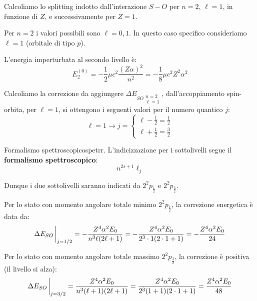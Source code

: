 \begin{exercise}
    Calcoliamo lo splitting indotto dall'interazione \( S-O \) per \( n=2 \), \( \ell=1 \), in funzione di \( Z \), e successivamente per \( Z=1 \).

\begin{solution}

Per \( n=2 \) i valori possibili sono \( \ell=0, 1 \). In questo caso specifico consideriamo \( \ell=1 \) (orbitale di tipo \( p \)).

L'energia imperturbata al secondo livello è:
\begin{equation}
    E_2^{(0)} = -\frac{1}{2} \mu c^2 \frac{(Z\alpha)^2}{n^2} = -\frac{1}{8} \mu c^2 Z^2 \alpha^2
\end{equation}

Calcoliamo la correzione da aggiungere \(\Delta E_{SO \substack{n=2 \\ \ell=1}}\), 
dall'accoppiamento spin-orbita, per \( \ell=1 \), si ottengono i seguenti valori per il numero quantico \( j \):
\begin{equation*}
    \ell=1 \longrightarrow j =
    \begin{cases}
        \ell - \frac{1}{2} = \frac{1}{2} \\[1ex]
        \ell + \frac{1}{2} = \frac{3}{2}
    \end{cases}
\end{equation*}
\begin{note}{Formalismo spettroscopico}{spetrr.}
    L'indicizzazione per i sottolivelli segue il \textbf{formalismo spettroscopico}:
\begin{equation}
    n ^{2s+1} \ell_j
\end{equation}
\end{note}

Dunque i due sottolivelli saranno indicati da \( 2^2 p_{\frac{1}{2}} \) e \( 2^2 p_\frac32 \).

Per lo stato con momento angolare totale minimo \(2^2p_\frac12\), la correzione energetica è data da:
\begin{equation*}
    \Delta E_{SO}\eval_{j=1/2} = - \frac{Z^4 \alpha^2 E_0}{n^3 \ell(2\ell+1)}
    = - \frac{Z^4 \alpha^2 E_0}{2^3 \cdot 1(2 \cdot 1 + 1)} = - \frac{Z^4 \alpha^2 E_0}{24}
\end{equation*}

Per lo stato con momento angolare totale massimo \(2^2p_{\frac32}\), la correzione è positiva (il livello si alza):
\begin{equation*}
    \Delta E_{SO}\eval_{j=3/2} = \frac{Z^4 \alpha^2 E_0}{n^3 (\ell+1)(2\ell+1)}
    = \frac{Z^4 \alpha^2 E_0}{2^3 (1+1)(2 \cdot 1 + 1)} = \frac{Z^4 \alpha^2 E_0}{48}
\end{equation*}


\end{solution}
\end{exercise}
